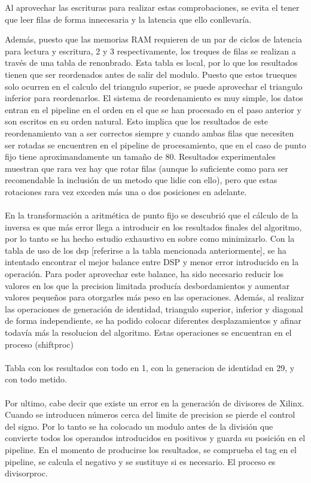 Al aprovechar las escrituras para realizar estas comprobaciones, se evita el tener que leer filas de forma innecesaria y la latencia que ello conllevaría.

Además, puesto que las memorias RAM requieren de un par de ciclos de latencia para lectura y escritura, 2 y 3 respectivamente, los treques de filas se realizan a través de una tabla de renonbrado. Esta tabla es local, por lo que los resultados tienen que ser reordenados antes de salir del modulo. Puesto que estos trueques solo ocurren en el calculo del triangulo superior, se puede aprovechar el triangulo inferior para reordenarlos. El sistema de reordenamiento es muy simple, los datos entran en el pipeline en el orden en el que se han procesado en el paso anterior y son escritos en su orden natural. Esto implica que los resultados de este reordenamiento van a ser correctos siempre y cuando ambas filas que necesiten ser rotadas se encuentren en el pipeline de procesamiento, que en el caso de  punto fijo tiene aproximandamente un tamaño de 80. Resultados experimentales muestran que rara vez hay que rotar filas (aunque lo suficiente como para ser recomendable la inclusión de un metodo que lidie con ello), pero que estas rotaciones rara vez exceden más una o dos posiciones en adelante.
\\
\\
En la transformación a aritmética de punto fijo se descubrió que el cálculo de la inversa es que más error llega a introducir en los resultados finales del algoritmo, por lo tanto se ha hecho estudio exhaustivo en  sobre como minimizarlo. Con la tabla de uso de los dsp [referirse a la tabla mencionada anteriormente], se ha intentado encontrar el mejor balance entre DSP y menor error introducido en la operación.
Para poder aprovechar este balance, ha sido necesario reducir los valores en los que la precision limitada producía desbordamientos y aumentar valores pequeños para otorgarles más peso en las operaciones. Además, al realizar las operaciones de generación de identidad, triangulo superior, inferior y diagonal de forma independiente, se ha podido colocar diferentes desplazamientos y afinar todavía más la resolucion del algoritmo. Estas operaciones se encuentran en el proceso (shiftproc)
\\
\\
Tabla con los resultados con todo en 1, con la generacion de identidad en 29, y con todo metido. 
\\
\\
Por ultimo, cabe decir que existe un error en la generación de divisores de Xilinx. Cuando se introducen números cerca del limite de precision se pierde el control del signo. Por lo tanto se ha colocado un modulo antes de la división que convierte todos los operandos introducidos en positivos y guarda su posición en el pipeline. En el momento de producirse los resultados, se comprueba el tag en el pipeline, se calcula el negativo y se sustituye si es necesario. El proceso es divisorproc.


